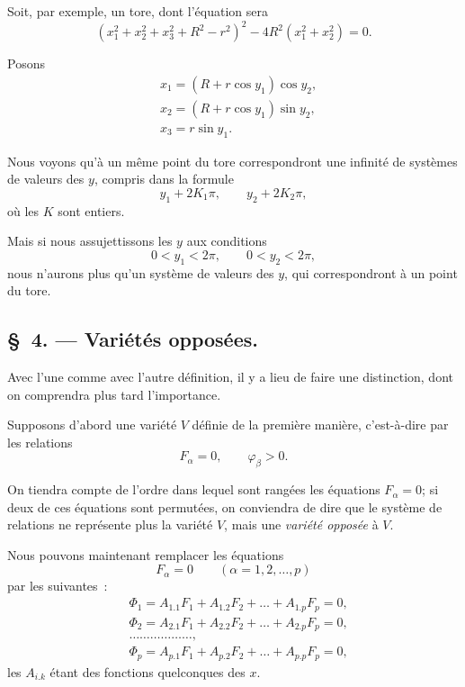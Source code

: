 \documentclass{article}
\begin{document}
Soit, par exemple, un tore, dont l'équation sera
\[
(x^{2}_{1} + x^{2}_{2} + x^{2}_{3} + R^{2} - r^{2})^{2} - 4R^{2}(x^{2}_{1} + x^{2}_{2}) = 0.
\]

Posons
\[
\begin{aligned}
&x_{1} = (R + r\cos y_{1})\cos y_{2},\\
&x_{2} = (R + r\cos y_{1})\sin y_{2},\\
&x_{3} = r\sin y_{1}.
\end{aligned}
\]

Nous voyons qu'à un même point du tore correspondront une infinité de systèmes de valeurs des $y$, compris dans la formule
\[
y_{1} + 2K_{1}\pi, \qquad y_{2} + 2K_{2}\pi,
\]
où les $K$ sont entiers.

Mais si nous assujettissons les $y$ aux conditions
\[
0 < y_{1} < 2\pi, \qquad 0 < y_{2} < 2\pi,
\]
nous n'aurons plus qu'un système de valeurs des $y$, qui correspondront à un point du tore.

\subsection*{\S~4. --- Variétés opposées.}

Avec l'une comme avec l'autre définition, il y a lieu de faire une distinction, dont on comprendra plus tard l'importance.

Supposons d'abord une variété $V$ définie de la première manière, c'est-à-dire par les relations
\[
F_{\alpha} = 0, \qquad \varphi_{\beta} > 0.
\]

On tiendra compte de l'ordre dans lequel sont rangées les équations $F_{\alpha} = 0$; si deux de ces équations sont permutées, on conviendra de dire
que le système de relations ne représente plus la variété $V$, mais une \emph{variété opposée} à $V$.

Nous pouvons maintenant remplacer les équations
\[
F_{\alpha} = 0 \qquad (\alpha = 1, 2, \ldots, p)
\]
par les suivantes~:
\[
\begin{aligned}
&\Phi_{1} = A_{1.1}F_{1} + A_{1.2}F_{2} + \ldots + A_{1.p}F_{p} = 0,\\
&\Phi_{2} = A_{2.1}F_{1} + A_{2.2}F_{2} + \ldots + A_{2.p}F_{p} = 0,\\
&\ldots\ldots\ldots\ldots\ldots\ldots,\\
&\Phi_{p} = A_{p.1}F_{1} + A_{p.2}F_{2} + \ldots + A_{p.p}F_{p} = 0,
\end{aligned}
\]
les $A_{i.k}$ étant des fonctions quelconques des $x$.
\end{document}
